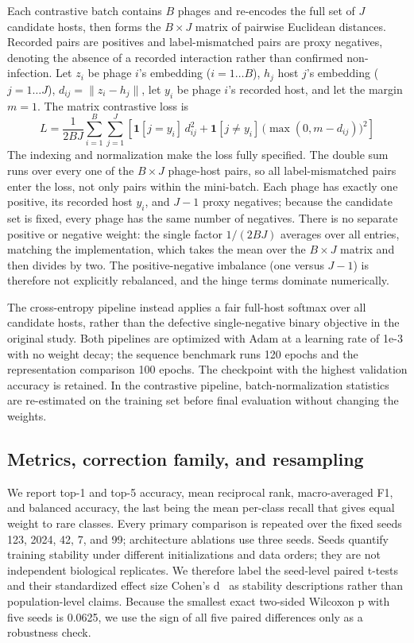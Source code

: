 \documentclass[utf8]{FrontiersinVancouver}
\begin{document}
Each contrastive batch contains $B$ phages and re-encodes the full set of $J$ candidate hosts, then forms the $B\times J$ matrix of pairwise Euclidean distances. Recorded pairs are positives and label-mismatched pairs are proxy negatives, denoting the absence of a recorded interaction rather than confirmed non-infection. Let $z_i$ be phage $i$'s embedding ($i=1\ldots B$), $h_j$ host $j$'s embedding ($j=1\ldots J$), $d_{ij}=\|z_i-h_j\|$, let $y_i$ be phage $i$'s recorded host, and let the margin $m=1$. The matrix contrastive loss is
\begin{equation}
L=\frac{1}{2BJ}\sum_{i=1}^{B}\sum_{j=1}^{J}\left[\mathbf{1}[j=y_i]\,d_{ij}^{2}+\mathbf{1}[j\neq y_i]\,\big(\max(0,m-d_{ij})\big)^2\right]
\label{eq:2}
\end{equation}
The indexing and normalization make the loss fully specified. The double sum runs over every one of the $B\times J$ phage-host pairs, so all label-mismatched pairs enter the loss, not only pairs within the mini-batch. Each phage has exactly one positive, its recorded host $y_i$, and $J-1$ proxy negatives; because the candidate set is fixed, every phage has the same number of negatives. There is no separate positive or negative weight: the single factor $1/(2BJ)$ averages over all entries, matching the implementation, which takes the mean over the $B\times J$ matrix and then divides by two. The positive-negative imbalance (one versus $J-1$) is therefore not explicitly rebalanced, and the hinge terms dominate numerically.

The cross-entropy pipeline instead applies a fair full-host softmax over all candidate hosts, rather than the defective single-negative binary objective in the original study. Both pipelines are optimized with Adam at a learning rate of 1e-3 with no weight decay; the sequence benchmark runs 120 epochs and the representation comparison 100 epochs. The checkpoint with the highest validation accuracy is retained. In the contrastive pipeline, batch-normalization statistics are re-estimated on the training set before final evaluation without changing the weights.

\subsection{Metrics, correction family, and resampling}

We report top-1 and top-5 accuracy, mean reciprocal rank, macro-averaged F1, and balanced accuracy, the last being the mean per-class recall that gives equal weight to rare classes. Every primary comparison is repeated over the fixed seeds 123, 2024, 42, 7, and 99; architecture ablations use three seeds. Seeds quantify training stability under different initializations and data orders; they are not independent biological replicates. We therefore label the seed-level paired t-tests and their standardized effect size Cohen's d~\citep{cohen1988statistical} as stability descriptions rather than population-level claims. Because the smallest exact two-sided Wilcoxon p with five seeds is 0.0625, we use the sign of all five paired differences only as a robustness check.
\end{document}
